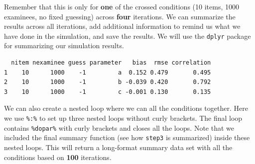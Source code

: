 \documentclass[
]{book}
\newenvironment{Shaded}{\begin{snugshade}}{\end{snugshade}}
\newcommand{\CommentTok}[1]{\textcolor[rgb]{0.56,0.35,0.01}{\textit{#1}}}
\newcommand{\DataTypeTok}[1]{\textcolor[rgb]{0.13,0.29,0.53}{#1}}
\newcommand{\DecValTok}[1]{\textcolor[rgb]{0.00,0.00,0.81}{#1}}
\newcommand{\KeywordTok}[1]{\textcolor[rgb]{0.13,0.29,0.53}{\textbf{#1}}}
\newcommand{\NormalTok}[1]{#1}
\newcommand{\OperatorTok}[1]{\textcolor[rgb]{0.81,0.36,0.00}{\textbf{#1}}}
\newcommand{\StringTok}[1]{\textcolor[rgb]{0.31,0.60,0.02}{#1}}
\begin{document}
Remember that this is only for \textbf{one} of the crossed conditions (10 items, 1000 examinees, no fixed guessing) across \textbf{four} iterations. We can summarize the results across all iterations, add additional information to remind us what we have done in the simulation, and save the results. We will use the \texttt{dplyr} package \citep{R-dplyr} for summarizing our simulation results.

\begin{Shaded}
\end{Shaded}

\begin{verbatim}
  nitem nexaminee guess parameter   bias  rmse correlation
1    10      1000    -1         a  0.152 0.479       0.495
2    10      1000    -1         b -0.039 0.420       0.792
3    10      1000    -1         c -0.001 0.130       0.135
\end{verbatim}

We can also create a nested loop where we can all the conditions together. Here we use \texttt{\%:\%} to set up three nested loops without curly brackets. The final loop contains \texttt{\%dopar\%} with curly brackets and closes all the loops. Note that we included the final summary function (see how \texttt{step3} is summarized) inside these nested loops. This will return a long-format summary data set with all the conditions based on \textbf{100} iterations.
\end{document}

